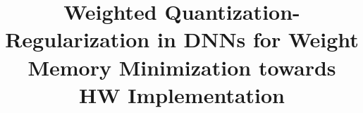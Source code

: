\documentclass[sigconf]{acmart}
\begin{document}
\title{Weighted Quantization-Regularization in DNNs for Weight Memory Minimization towards HW Implementation}

\renewcommand{\shorttitle}{WQR in DNNs for Weight Memory Minimization towards HW Implementation}









%
%
\end{document}
